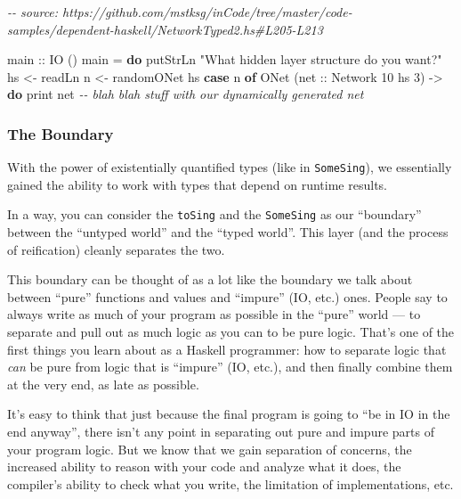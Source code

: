 \documentclass[]{article}
\newenvironment{Shaded}{}{}
\newcommand{\CommentTok}[1]{\textcolor[rgb]{0.38,0.63,0.69}{\textit{#1}}}
\newcommand{\DataTypeTok}[1]{\textcolor[rgb]{0.56,0.13,0.00}{#1}}
\newcommand{\DecValTok}[1]{\textcolor[rgb]{0.25,0.63,0.44}{#1}}
\newcommand{\FunctionTok}[1]{\textcolor[rgb]{0.02,0.16,0.49}{#1}}
\newcommand{\KeywordTok}[1]{\textcolor[rgb]{0.00,0.44,0.13}{\textbf{#1}}}
\newcommand{\NormalTok}[1]{#1}
\newcommand{\OtherTok}[1]{\textcolor[rgb]{0.00,0.44,0.13}{#1}}
\newcommand{\StringTok}[1]{\textcolor[rgb]{0.25,0.44,0.63}{#1}}
\begin{document}
\begin{Shaded}
\begin{Highlighting}[]
\CommentTok{{-}{-} source: https://github.com/mstksg/inCode/tree/master/code{-}samples/dependent{-}haskell/NetworkTyped2.hs\#L205{-}L213}

\OtherTok{main ::} \DataTypeTok{IO}\NormalTok{ ()}
\NormalTok{main }\OtherTok{=} \KeywordTok{do}
    \FunctionTok{putStrLn} \StringTok{"What hidden layer structure do you want?"}
\NormalTok{    hs }\OtherTok{\textless{}{-}} \FunctionTok{readLn}
\NormalTok{    n  }\OtherTok{\textless{}{-}}\NormalTok{ randomONet hs}
    \KeywordTok{case}\NormalTok{ n }\KeywordTok{of}
      \DataTypeTok{ONet}\NormalTok{ (}\OtherTok{net ::} \DataTypeTok{Network} \DecValTok{10}\NormalTok{ hs }\DecValTok{3}\NormalTok{) }\OtherTok{{-}\textgreater{}} \KeywordTok{do}
        \FunctionTok{print}\NormalTok{ net}
        \CommentTok{{-}{-} blah blah stuff with our dynamically generated net}
\end{Highlighting}
\end{Shaded}

\subsubsection{The Boundary}\label{the-boundary}

With the power of existentially quantified types (like in \texttt{SomeSing}), we
essentially gained the ability to work with types that depend on runtime
results.

In a way, you can consider the \texttt{toSing} and the \texttt{SomeSing} as our
``boundary'' between the ``untyped world'' and the ``typed world''. This layer
(and the process of reification) cleanly separates the two.

This boundary can be thought of as a lot like the boundary we talk about between
``pure'' functions and values and ``impure'' (IO, etc.) ones. People say to
always write as much of your program as possible in the ``pure'' world --- to
separate and pull out as much logic as you can to be pure logic. That's one of
the first things you learn about as a Haskell programmer: how to separate logic
that \emph{can} be pure from logic that is ``impure'' (IO, etc.), and then
finally combine them at the very end, as late as possible.

It's easy to think that just because the final program is going to ``be in IO in
the end anyway'', there isn't any point in separating out pure and impure parts
of your program logic. But we know that we gain separation of concerns, the
increased ability to reason with your code and analyze what it does, the
compiler's ability to check what you write, the limitation of implementations,
etc.
\end{document}

